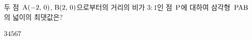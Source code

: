 두 점~$\mathrm{A}(-2,\,0)$, $\mathrm{B}(2,\,0)$으로부터의 거리의 비가 $3:1$인 점~$\mathrm{P}$에 대하여 삼각형~$\mathrm{PAB}$의 넓이의 최댓값은?
\begin{choices32}{$3$}{$4$}{$5$}{$6$}{$7$}\end{choices32}
